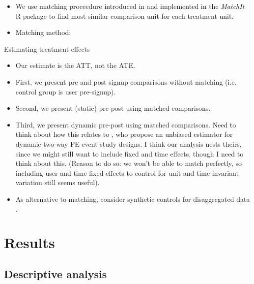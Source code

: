 \documentclass[a4paper, 11pt]{article}
\begin{document}
\begin{itemize}
    \item We use matching proceedure introduced in \citet{ho2007matching} and
        implemented in the \textit{MatchIt} R-package \citep{stuart2011matchit} to
        find most similar comparison unit for each treatment unit.

    \item Matching method:

\end{itemize}

Estimating treatment effects
\begin{itemize}

    \item Our estimate is the ATT, not the ATE. 

    \item First, we present pre and post signup comparisons without matching
        (i.e. control group is user pre-signup).

    \item Second, we present (static) pre-post using matched comparisons.

    \item Third, we present dynamic pre-post using matched comparisons. Need to
        think about how this relates to \citet{sun2021estimating}, who propose
        an unbiased estimator for dynamic two-way FE event study designs. I
        think our analysis nests theirs, since we might still want to include
        fixed and time effects, though I need to think about this. (Reason to
        do so: we won't be able to match perfectly, so including user and time
        fixed effects to control for unit and time invariant variation still
        seems useful).

    \item As alternative to matching, consider synthetic controls for
        disaggregated data \citep{abadie2021penalized}.

\end{itemize}


% 
\section{Results}%
\label{sec:results}

\subsection{Descriptive analysis}%
\label{sub:descriptive_analysis}
\end{document}
